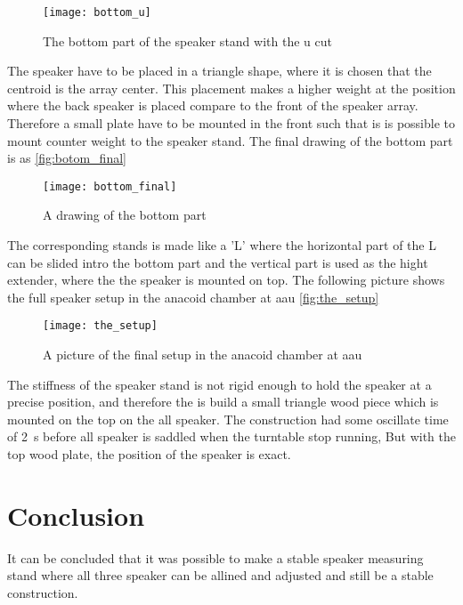  \begin{figure}[H]
	\centering
	\texttt{[image: bottom\_u]}
	\caption{The bottom part of the speaker stand with the u cut}
		\label{fig:botom_u}
\end{figure}

The speaker have to be placed in a triangle shape, where it is chosen that the centroid is the array center. This placement makes a higher weight at the position where the back speaker is placed compare to the front of the speaker array. Therefore a small plate have to be mounted in the front such that is is possible to mount counter weight to the speaker stand. The final drawing of the bottom part is as \autoref{fig:botom_final}

  \begin{figure}[H]
	\centering
	\texttt{[image: bottom\_final]}
	\caption{A drawing of the bottom part}
		\label{fig:botom_final}
\end{figure}

The corresponding stands is made like a 'L' where the horizontal part of the L can be slided intro the bottom part and the vertical part is used as the hight extender, where the the speaker is mounted on top. The following picture shows the full speaker setup in the anacoid chamber at \gls{aau} \autoref{fig:the_setup}

  \begin{figure}[H]
	\centering
	\texttt{[image: the\_setup]}
	\caption{A picture of the final setup in the anacoid chamber at \gls{aau}}
		\label{fig:the_setup}
\end{figure}

The stiffness of the speaker stand is not rigid enough to hold the speaker at a precise position, and therefore the is build a small triangle wood piece which is mounted on the top on the all speaker. The construction had some oscillate time of \SI{2}{\second} before all speaker is saddled when the turntable stop running, But with the top wood plate, the position of the speaker is exact. 

\section{Conclusion}

It can be concluded that it was possible to make a stable speaker measuring stand where all three speaker can be allined and adjusted and still be a stable construction.




